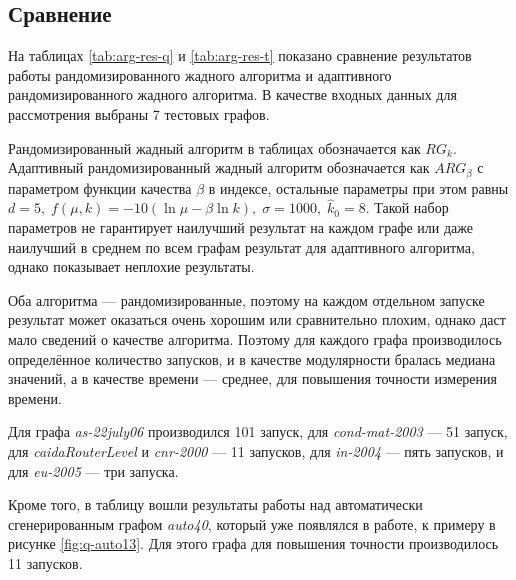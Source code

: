 
\subsection{Сравнение}
\label{subsec:arg-res}

На таблицах \ref{tab:arg-res-q} и \ref{tab:arg-res-t} показано сравнение результатов работы рандомизированного жадного алгоритма и адаптивного рандомизированного жадного алгоритма. В качестве входных данных для рассмотрения выбраны 7 тестовых графов.

Рандомизированный жадный алгоритм в таблицах обозначается как $RG_k$. Адаптивный рандомизированный жадный алгоритм обозначается как $ARG_{\beta}$ с параметром функции качества $\beta$ в индексе, остальные параметры при этом равны $d = 5,\;f(\mu, k) = -10 (\ln \mu - \beta \ln k),\;\sigma = 1000,\;\hat{k}_0 = 8$. Такой набор параметров не гарантирует наилучший результат на каждом графе или даже наилучший в среднем по всем графам результат для адаптивного алгоритма, однако показывает неплохие результаты.

Оба алгоритма --- рандомизированные, поэтому на каждом отдельном запуске результат может оказаться очень хорошим или сравнительно плохим, однако даст мало сведений о качестве алгоритма. Поэтому для каждого графа производилось определённое количество запусков, и в качестве модулярности бралась медиана значений, а в качестве времени --- среднее, для повышения точности измерения времени.

Для графа \emph{as-22july06} производился 101 запуск, для \emph{cond-mat-2003} --- 51 запуск, для \emph{caidaRouterLevel} и \emph{cnr-2000} --- 11 запусков, для \emph{in-2004} --- пять запусков, и для \emph{eu-2005} --- три запуска.

Кроме того, в таблицу вошли результаты работы над автоматически сгенерированным графом \emph{auto40}, который уже появлялся в работе, к примеру в рисунке \ref{fig:q-auto13}. Для этого графа для повышения точности производилось 11 запусков.

